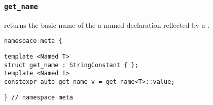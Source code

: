 

\subsubsection{\texttt{get\_name}}

returns the basic name of the a named declaration reflected by a .

\begin{verbatim}
namespace meta {
\end{verbatim}
\begin{verbatim}
template <Named T>
struct get_name : StringConstant { };
template <Named T>
constexpr auto get_name_v = get_name<T>::value;
\end{verbatim}
\begin{verbatim}
} // namespace meta
\end{verbatim}

